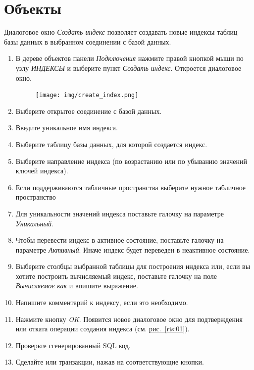 \newpage


\section{Объекты}\label{sec:objects}

\label{sec:crind}

Диалоговое окно \textit{Создать индекс} позволяет создавать новые индексы таблиц базы данных в выбранном соединении с базой данных.

\begin{enumerate}[leftmargin=26pt]
	\item В дереве объектов панели \textit{Подключения} нажмите правой кнопкой мыши по узлу \textit{ИНДЕКСЫ} и выберите пункт \textit{Создать индекс}. Откроется диалоговое окно.
	\begin{figure}[H]
		\centering
		\texttt{[image: img/create\_index.png]}
	\end{figure}	
	\item Выберите открытое соединение с базой данных.
	\item Введите уникальное имя индекса.
	\item Выберите таблицу базы данных, для которой создается индекс.
	\item Выберите направление индекса (по возрастанию или по убыванию значений ключей индекса).
	\item Если поддерживаются табличные пространства выберите нужное табличное пространство
	\item Для уникальности значений индекса поставьте галочку на параметре \textit{Уникальный}.
	\item Чтобы перевести индекс в активное состояние, поставьте галочку на параметре \textit{Активный}. Иначе индекс будет переведен в неактивное состояние.
	\item Выберите столбцы выбранной таблицы для построения индекса или, если вы хотите построить вычисляемый индекс, поставьте галочку на поле \textit{Вычисляемое как} и впишите выражение.
	\item Напишите комментарий к индексу, если это необходимо.
	\item Нажмите кнопку \textit{OK}. Появится новое диалоговое окно для подтверждения или отката операции создания индекса (см. \hyperref[ris:01]{рис.~\ref{ris:01}}).
	\item Проверьте сгенерированный SQL код.
	\item Сделайте  или  транзакции, нажав на соответствующие кнопки.
\end{enumerate}

